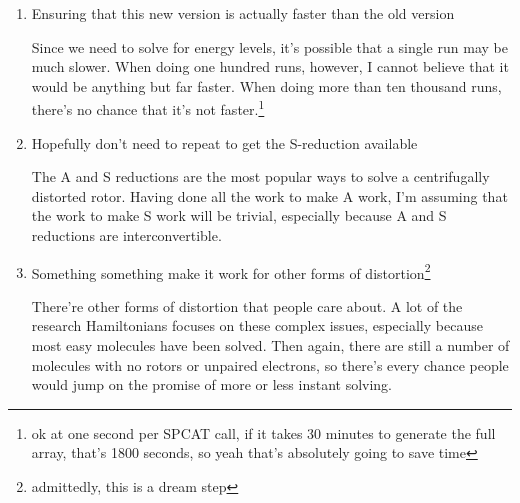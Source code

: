 \documentclass[12pt]{article}
\renewcommand{\,}{\textsuperscript{,}}
\begin{document}
\begin{enumerate}
There's, as far as I can tell, basically a single paper that people use for determining the transition intensity of a rotational transition.  
I'll read the literature a little more to make sure that's true\footnote{read: look at the WesterFit paper and see if they use anything else}, and then have the calculations run given the arbitrary constants and some arbitrary values for the dipoles.

Realistically, as long as they more or less approximate the values that SPCAT uses, I'm totally happy.  
SPCAT is known to produce approximate transition intensities, and so that's so totally fine with me if mine is approximate as well.  
One issue I'm foreseeing is that calculating transition intensities requires population analysis, which is temperature dependent.  
My assumption is this is where most of SPCAT's runtime actually occurs, and so that's not great.\footnote{then again, there's also likely a fair amount of time spent manually writing the file with all of the data it uses}  
Then again, it's also likely something that I can extrapolate to a general form when solving the Hamiltonian a million times.

E.g. if I solve the relative population as a function of energy one time at the start of the run (or for all energies before a run), then all I really have to do is use a lookup table! (Assuming that this is the right way of viewing the problem. I forget whether the exponent has other funky things)  
\item Ensuring that this new version is actually faster than the old version

Since we need to solve for energy levels, it's possible that a single run may be much slower.  
When doing one hundred runs, however, I cannot believe that it would be anything but far faster.  
When doing more than ten thousand runs, there's no chance that it's not faster.\footnote{ok at one second per SPCAT call, if it takes 30 minutes to generate the full array, that's 1800 seconds, so yeah that's absolutely going to save time}  
\item Hopefully don't need to repeat to get the S-reduction available

The A and S reductions are the most popular ways to solve a centrifugally distorted rotor.  
Having done all the work to make A work, I'm assuming that the work to make S work will be trivial, especially because A and S reductions are interconvertible.  
\item Something something make it work for other forms of distortion\footnote{admittedly, this is a dream step}

There're other forms of distortion that people care about. A lot of the research Hamiltonians focuses on these complex issues, especially because most easy molecules have been solved.  
Then again, there are still a number of molecules with no rotors or unpaired electrons, so there's every chance people would jump on the promise of more or less instant solving.  
\end{enumerate}
\end{document}

